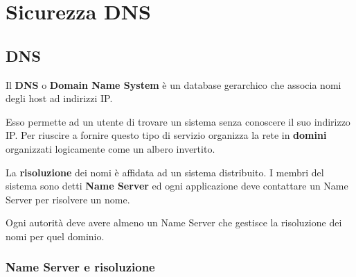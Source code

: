 \chapter{Sicurezza DNS}
\section{DNS}
Il \textbf{DNS} o \textbf{Domain Name System} è un database gerarchico che associa nomi degli host ad indirizzi IP.

Esso permette ad un utente di trovare un sistema senza conoscere il suo indirizzo IP. Per riuscire a fornire questo
tipo di servizio organizza la rete in \textbf{domini} organizzati logicamente come un albero invertito.

La \textbf{risoluzione} dei nomi è affidata ad un sistema distribuito. I membri del sistema sono detti
\textbf{Name Server} ed ogni applicazione deve contattare un Name Server per risolvere un nome.

Ogni autorità deve avere almeno un Name Server che gestisce la risoluzione dei nomi per quel dominio.

\subsection{Name Server e risoluzione}